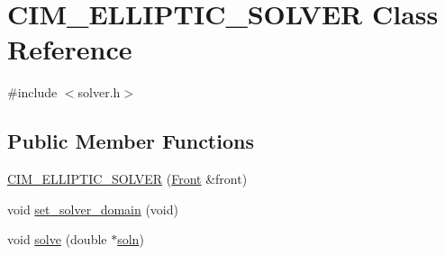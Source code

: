 \hypertarget{class_c_i_m___e_l_l_i_p_t_i_c___s_o_l_v_e_r}{}\section{C\+I\+M\+\_\+\+E\+L\+L\+I\+P\+T\+I\+C\+\_\+\+S\+O\+L\+V\+ER Class Reference}
\label{class_c_i_m___e_l_l_i_p_t_i_c___s_o_l_v_e_r}


{\ttfamily \#include $<$solver.\+h$>$}

\subsection*{Public Member Functions}
\begin{DoxyCompactItemize}
\item 
\hyperlink{class_c_i_m___e_l_l_i_p_t_i_c___s_o_l_v_e_r_a65112d96c3671d40a061df915a4fef4e}{C\+I\+M\+\_\+\+E\+L\+L\+I\+P\+T\+I\+C\+\_\+\+S\+O\+L\+V\+ER} (\hyperlink{fdecs_8h_ac32202b798f848095c489cfd04c4ca5f}{Front} \&front)
\item 
void \hyperlink{class_c_i_m___e_l_l_i_p_t_i_c___s_o_l_v_e_r_abdc44cefe215408806052269b26a0032}{set\+\_\+solver\+\_\+domain} (void)
\item 
void \hyperlink{class_c_i_m___e_l_l_i_p_t_i_c___s_o_l_v_e_r_a2fce34800751a40c95507f56f8027111}{solve} (double $\ast$\hyperlink{class_c_i_m___e_l_l_i_p_t_i_c___s_o_l_v_e_r_a8dcbe825756677f5083625775f3d3517}{soln})
\end{DoxyCompactItemize}
